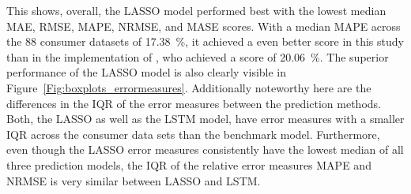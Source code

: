 This shows, overall, the LASSO model performed best with the lowest median MAE, RMSE, MAPE, NRMSE, and MASE scores. With a median MAPE across the 88 consumer datasets of 17.38~\%, it achieved a even better score in this study than in the implementation of \citet{Li:2017}, who achieved a score of 20.06~\%. The superior performance of the LASSO model is also clearly visible in Figure~\ref{Fig:boxplots_errormeasures}. Additionally noteworthy here are the differences in the IQR of the error measures between the prediction methods. Both, the LASSO as well as the LSTM model, have error measures with a smaller IQR across the consumer data sets than the benchmark model. Furthermore, even though the LASSO error measures consistently have the lowest median of all three prediction models, the IQR of the relative error measures MAPE and NRMSE is very similar between LASSO and LSTM.
%

